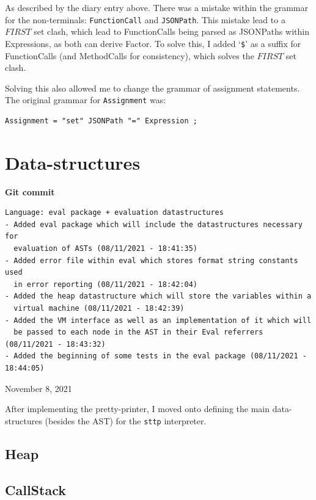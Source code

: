 \documentclass[]{full}
\theoremstyle{definition}
\begin{document}
As described by the diary entry above. There was a mistake within the grammar for the non-terminals: \verb|FunctionCall| and \verb|JSONPath|. This mistake lead to a $FIRST$ set clash, which lead to FunctionCalls being parsed as JSONPaths within Expressions, as both can derive Factor. To solve this, I added `\verb|$|' as a suffix for FunctionCalls (and MethodCalls for consistency), which solves the $FIRST$ set clash.

Solving this also allowed me to change the grammar of assignment statements. The original grammar for \verb|Assignment| was:

\begin{verbatim}
Assignment = "set" JSONPath "=" Expression ;
\end{verbatim}

\section{Data-structures}

\begin{center}
    \textbf{Git commit}
    \begin{verbatim}
Language: eval package + evaluation datastructures
- Added eval package which will include the datastructures necessary for
  evaluation of ASTs (08/11/2021 - 18:41:35)
- Added error file within eval which stores format string constants used
  in error reporting (08/11/2021 - 18:42:04)
- Added the heap datastructure which will store the variables within a
  virtual machine (08/11/2021 - 18:42:39)
- Added the VM interface as well as an implementation of it which will
  be passed to each node in the AST in their Eval referrers (08/11/2021 - 18:43:32)
- Added the beginning of some tests in the eval package (08/11/2021 - 18:44:05)
    \end{verbatim}
    \vspace{-1em}
    \tiny{November 8, 2021}
\end{center}

After implementing the pretty-printer, I moved onto defining the main data-structures (besides the AST) for the \verb|sttp| interpreter.

\subsection{Heap}

\subsection{CallStack}
\end{document}
